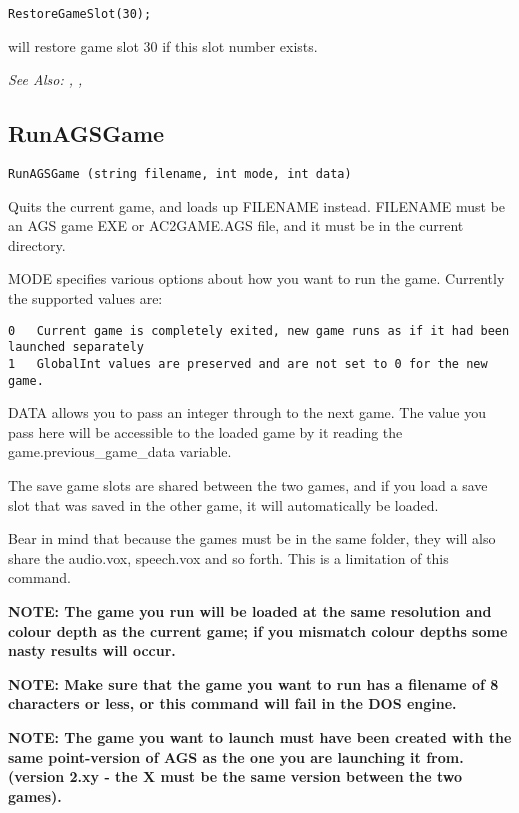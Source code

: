 \begin{verbatim}
RestoreGameSlot(30);
\end{verbatim}
will restore game slot 30 if this slot number exists.

\it{See Also:} ,
, 


\subsection{RunAGSGame}\label{RunAGSGame}%

\begin{verbatim}
RunAGSGame (string filename, int mode, int data)
\end{verbatim}
Quits the current game, and loads up FILENAME instead. FILENAME must be an AGS game EXE
or AC2GAME.AGS file, and it must be in the current directory.

MODE specifies various options about how you want to run the game. Currently the supported
values are:
\begin{verbatim}
0   Current game is completely exited, new game runs as if it had been launched separately
1   GlobalInt values are preserved and are not set to 0 for the new game.
\end{verbatim}

DATA allows you to pass an integer through to the next game. The value you pass here
will be accessible to the loaded game by it reading the  game.previous_game_data  variable.

The save game slots are shared between the two games, and if you load a save slot that
was saved in the other game, it will automatically be loaded.

Bear in mind that because the games must be in the same folder, they will also share
the audio.vox, speech.vox and so forth. This is a limitation of this command.

\bf{NOTE:} The game you run will be loaded at the same resolution and colour depth as the
current game; if you mismatch colour depths some nasty results will occur.

\bf{NOTE:} Make sure that the game you want to run has a filename of 8 characters or less,
or this command will fail in the DOS engine.

\bf{NOTE:} The game you want to launch must have been created with the same point-version
of AGS as the one you are launching it from. (version 2.xy - the X must be the same version
between the two games).

